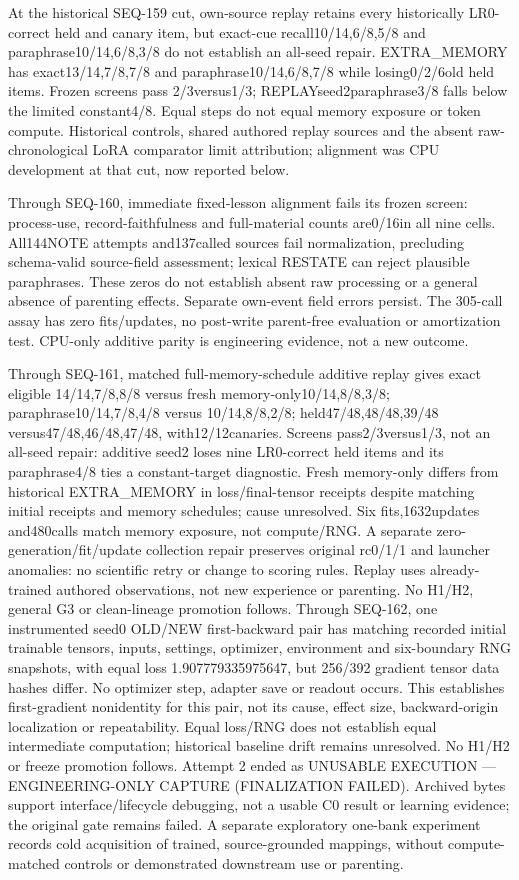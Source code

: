 \documentclass{article}
\begin{document}
At the historical SEQ-159 cut, own-source replay retains every historically LR0-correct held
and canary item, but exact-cue recall10/14,6/8,5/8 and paraphrase10/14,6/8,3/8
do not establish an all-seed repair. EXTRA\_MEMORY has exact13/14,7/8,7/8 and
paraphrase10/14,6/8,7/8 while losing0/2/6old held items. Frozen screens pass
2/3versus1/3; REPLAYseed2paraphrase3/8 falls below the limited constant4/8.
Equal steps do not equal memory exposure or token compute. Historical controls,
shared authored replay sources and the absent raw-chronological LoRA comparator
limit attribution; alignment was CPU development at that cut, now reported below.

Through SEQ-160, immediate fixed-lesson alignment fails its frozen screen:
process-use, record-faithfulness and full-material counts are0/16in all nine
cells. All144NOTE attempts and137called sources fail normalization, precluding
schema-valid source-field assessment; lexical RESTATE can reject plausible
paraphrases. These zeros do not establish absent raw processing or a general
absence of parenting effects. Separate own-event field errors persist. The
305-call assay has zero fits/updates, no post-write parent-free evaluation or amortization
test. CPU-only additive parity is engineering evidence, not a new outcome.

Through SEQ-161, matched full-memory-schedule additive replay gives exact eligible
14/14,7/8,8/8 versus fresh memory-only10/14,8/8,3/8; paraphrase10/14,7/8,4/8 versus
10/14,8/8,2/8; held47/48,48/48,39/48 versus47/48,46/48,47/48, with12/12canaries.
Screens pass2/3versus1/3, not an all-seed repair: additive seed2 loses nine
LR0-correct held items and its paraphrase4/8 ties a constant-target diagnostic.
Fresh memory-only differs from historical EXTRA\_MEMORY in loss/final-tensor
receipts despite matching initial receipts and memory schedules; cause unresolved.
Six fits,1632updates and480calls match memory exposure, not compute/RNG. A separate
zero-generation/fit/update collection repair preserves original rc0/1/1 and
launcher anomalies: no scientific retry or change to scoring rules. Replay uses
already-trained authored observations, not new experience or parenting. No
H1/H2, general G3 or clean-lineage promotion follows.
Through SEQ-162, one instrumented seed0 OLD/NEW first-backward pair has
matching recorded initial trainable tensors, inputs, settings, optimizer,
environment and six-boundary RNG snapshots, with equal loss 1.907779335975647,
but 256/392 gradient tensor data hashes differ. No optimizer step, adapter save
or readout occurs. This establishes first-gradient nonidentity for this pair,
not its cause, effect size, backward-origin localization or repeatability.
Equal loss/RNG does not establish equal intermediate computation; historical
baseline drift remains unresolved. No H1/H2 or freeze promotion follows.
Attempt 2 ended as UNUSABLE EXECUTION --- ENGINEERING-ONLY CAPTURE
(FINALIZATION FAILED). Archived bytes support interface/lifecycle debugging,
not a usable C0 result or learning evidence; the original gate remains failed.
A separate exploratory one-bank experiment records cold acquisition of trained, source-grounded mappings, without compute-matched controls or demonstrated downstream use or parenting.
\end{document}
